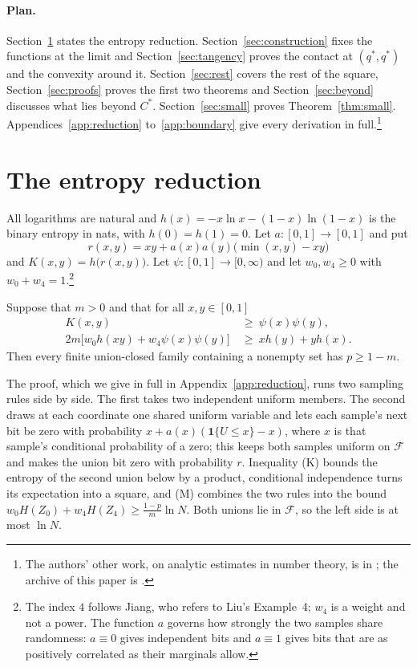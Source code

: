 \documentclass[12pt]{article}
\theoremstyle{plain}
\newcommand{\cF}{\mathcal{F}}
\newcommand{\qs}{q^{*}}
\newcommand{\Cs}{C^{*}}
\begin{document}
\paragraph*{Plan.} Section~\ref{sec:reduction} states the entropy reduction. Section~\ref{sec:construction} fixes the functions at the limit and Section~\ref{sec:tangency} proves the contact at $(\qs,\qs)$ and the convexity around it. Section~\ref{sec:rest} covers the rest of the square, Section~\ref{sec:proofs} proves the first two theorems and Section~\ref{sec:beyond} discusses what lies beyond $\Cs$. Section~\ref{sec:small} proves Theorem~\ref{thm:small}. Appendices~\ref{app:reduction} to~\ref{app:boundary} give every derivation in full.\footnote{The authors' other work, on analytic estimates in number theory, is in \cite{BNFS26,BB26}; the archive of this paper is \cite{BB26z}.}

\section{The entropy reduction}\label{sec:reduction}

All logarithms are natural and $h(x)=-x\ln x-(1-x)\ln(1-x)$ is the binary entropy in nats, with $h(0)=h(1)=0$. Let $a:[0,1]\to[0,1]$ and put
\begin{equation}\label{eq:r}
r(x,y)=xy+a(x)a(y)\bigl(\min(x,y)-xy\bigr)
\end{equation}
and $K(x,y)=h\bigl(r(x,y)\bigr)$.
Let $\psi:[0,1]\to[0,\infty)$ and let $w_0,w_4\ge 0$ with $w_0+w_4=1$.\footnote{The index $4$ follows Jiang, who refers to Liu's Example~4; $w_4$ is a weight and not a power. The function $a$ governs how strongly the two samples share randomness: $a\equiv 0$ gives independent bits and $a\equiv 1$ gives bits that are as positively correlated as their marginals allow.}

\begin{proposition}\label{prop:reduction}
Suppose that $m>0$ and that for all $x,y\in[0,1]$
\begin{align}
K(x,y)&\ \ge\ \psi(x)\psi(y), \tag{K}\label{eq:K}\\
2m\bigl[w_0h(xy)+w_4\psi(x)\psi(y)\bigr]&\ \ge\ xh(y)+yh(x). \tag{M}\label{eq:M}
\end{align}
Then every finite union-closed family containing a nonempty set has $p\ge 1-m$.
\end{proposition}

The proof, which we give in full in Appendix~\ref{app:reduction}, runs two sampling rules side by side. The first takes two independent uniform members. The second draws at each coordinate one shared uniform variable and lets each sample's next bit be zero with probability $x+a(x)(\mathbf 1\{U\le x\}-x)$, where $x$ is that sample's conditional probability of a zero; this keeps both samples uniform on $\cF$ and makes the union bit zero with probability $r$. Inequality (K) bounds the entropy of the second union below by a product, conditional independence turns its expectation into a square, and (M) combines the two rules into the bound $w_0H(Z_0)+w_4H(Z_4)\ge \frac{1-p}{m}\ln N$. Both unions lie in $\cF$, so the left side is at most $\ln N$.
\end{document}
